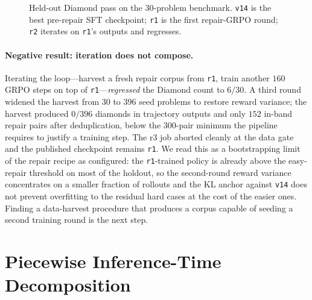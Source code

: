 \documentclass[11pt]{article}
\begin{document}
\begin{figure}[t]
\centering
{}
\caption{Held-out Diamond pass on the $30$-problem benchmark.
\texttt{v14} is the best pre-repair SFT checkpoint; \texttt{r1} is
the first repair-GRPO round; \texttt{r2} iterates on \texttt{r1}'s
outputs and regresses.}
\label{fig:repair-bars}
\end{figure}

\paragraph{Negative result: iteration does not compose.} Iterating
the loop---harvest a fresh repair corpus from \texttt{r1}, train
another $160$ GRPO steps on top of \texttt{r1}---\emph{regressed}
the Diamond count to $6/30$. A third round widened the harvest from
$30$ to $396$ seed problems to restore reward variance; the harvest
produced $0/396$ diamonds in trajectory outputs and only $152$
in-band repair pairs after deduplication, below the $300$-pair
minimum the pipeline requires to justify a training step. The r3 job
aborted cleanly at the data gate and the published checkpoint
remains \texttt{r1}. We read this as a bootstrapping limit of the
repair recipe as configured: the \texttt{r1}-trained policy is
already above the easy-repair threshold on most of the holdout, so
the second-round reward variance concentrates on a smaller fraction
of rollouts and the KL anchor against \texttt{v14} does not prevent
overfitting to the residual hard cases at the cost of the easier
ones. Finding a data-harvest procedure that produces a corpus
capable of seeding a second training round is the next step.

\section{Piecewise Inference-Time Decomposition}
\label{sec:piecewise}
\end{document}
